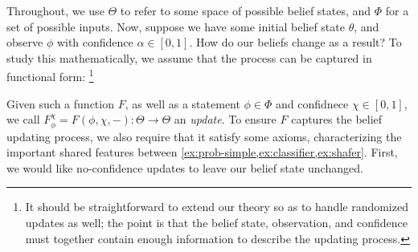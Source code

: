 
Throughout, we use $\Theta$ to refer to some space of possible belief states,
and $\Phi$ for a set of possible inputs. 
%
Now, suppose we have some initial belief state $\theta$, and observe $\phi$ with confidence $\alpha \in [0,1]$. 
How do our beliefs change as a result? 
To study this mathematically, we assume that the process can be captured in functional form:
\unskip\footnote{%
	It should be straightforward to extend our theory
	so as to handle randomized updates as well;
	the point is that
	the belief state, observation, and confidence must together contain
	enough information to describe the updating process.
	}

Given such a function $F$, as well as a statement $\phi \in \Phi$
and confidnece $\chi \in [0,1]$, we call 
$F^\chi_\phi = F(\phi, \chi, -) : \Theta \to \Theta$
an \emph{update}.
To ensure $F$ captures the belief updating process, we also require that it satisfy some axioms, characterizing the important shared features between \cref{ex:prob-simple,ex:classifier,ex:shafer}.
First, we would like no-confidence updates to leave our belief state unchanged. 

